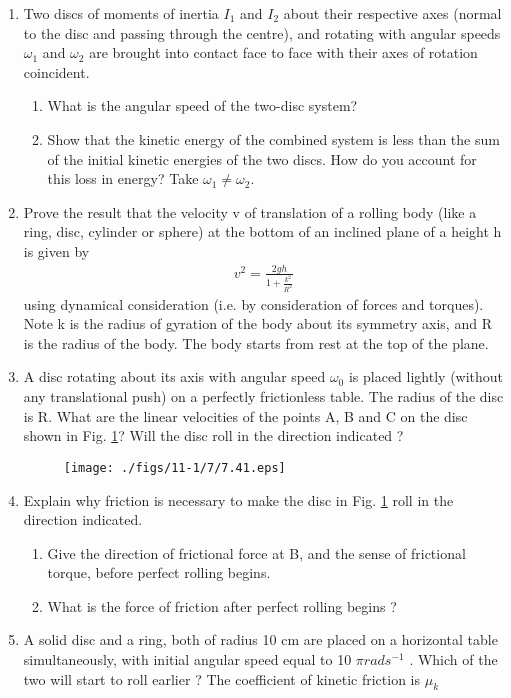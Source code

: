 \begin{enumerate}[label=\thesection.\arabic*.,ref=\thesection.\theenumi]
\item  Two discs of moments of inertia $I_1$ and $I_2$ about their respective axes (normal to the disc and passing through the centre), and rotating with angular speeds $\omega_1$ and $\omega_2$ are brought into contact face to face with their axes of rotation coincident. 
\begin{enumerate}[label=(\alph*)]
\item  What is the angular speed of the two-disc system? 
\item  Show that the kinetic energy of the combined system is less than the sum of the initial kinetic energies of the two discs. How do you account for this loss in energy? Take $\omega_1 \ne \omega_2$.
\end{enumerate}

\item Prove the result that the velocity v of translation of a rolling body (like a ring, disc, cylinder or sphere) at the bottom of an inclined plane of a height h is given by
\begin{align}
v^2 = \frac{2gh}{1+\frac{k^2}{R^2}}
\end{align}
using dynamical consideration (i.e. by consideration of forces and torques). Note k is the radius of gyration of the body about its symmetry axis, and R is the radius of the body. The body starts from rest at the top of the plane.
\item A disc rotating about its axis with angular speed $\omega_0$ is placed lightly (without any translational push) on a perfectly frictionless table. The radius of the disc is R. What are the linear velocities of the points A, B and C on the disc shown in Fig. \ref{fig:7.41}? Will the disc roll in the direction indicated ?
\begin{figure}[!ht]
\texttt{[image: ./figs/11-1/7/7.41.eps]}
\caption{}
\label{fig:7.41}
\end{figure}
\item Explain why friction is necessary to make the disc in Fig. \ref{fig:7.41} roll in the direction indicated. 
\begin{enumerate}[label=(\alph*)]
\item  Give the direction of frictional force at B, and the sense of frictional torque, before perfect rolling begins.
\item  What is the force of friction after perfect rolling begins ?
\end{enumerate}
\item  A solid disc and a ring, both of radius 10 cm are placed on a horizontal table simultaneously, with initial angular speed equal to 10 $\pi rad s^{-1}$ . Which of the two will start to roll earlier ? The coefficient of kinetic friction is $\mu_k$

\end{enumerate}
